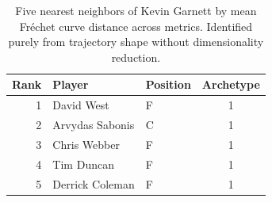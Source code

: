 \begin{table}[htbp]
  \centering\small
  \begin{tabular}{rllc}
    \toprule
    Rank & Player & Position & Archetype \\
    \midrule
    1 & David West & F & 1 \\
    2 & Arvydas Sabonis & C & 1 \\
    3 & Chris Webber & F & 1 \\
    4 & Tim Duncan & F & 1 \\
    5 & Derrick Coleman & F & 1 \\
    \bottomrule
  \end{tabular}
  \caption{Five nearest neighbors of Kevin Garnett by mean Fr\'{e}chet curve distance across metrics. Identified purely from trajectory shape without dimensionality reduction.}
  \label{tab:Kevin_Garnett_frechet_curve_neighbors}
\end{table}

